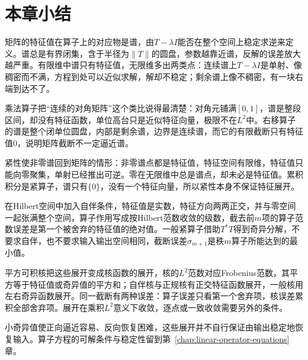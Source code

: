 \section{本章小结}
\label{sec:ospec-summary}

矩阵的特征值在算子上的对应物是谱，由$T-\lambda I$能否在整个空间上稳定求逆来定义。谱总是有界闭集，含于半径为$\lVert T\rVert$的圆盘，参数越靠近谱，反解的误差放大越严重。有限维中谱只有特征值，无限维多出两类点：连续谱上$T-\lambda I$是单射、像稠密而不满，方程到处可以近似求解，解却不稳定；剩余谱上像不稠密，有一块右端到达不了。

乘法算子把“连续的对角矩阵”这个类比说得最清楚：对角元铺满$[0,1]$，谱是整段区间，却没有特征函数，单位高台只是近似特征向量，极限不在$L^2$中。右移算子的谱是整个闭单位圆盘，内部是剩余谱，边界是连续谱，而它的有限截断只有特征值$0$，说明矩阵截断不一定逼近谱。

紧性使非零谱回到矩阵的情形：非零谱点都是特征值，特征空间有限维，特征值只能向零聚集，单射已经推出可逆。零在无限维中总是谱点，却未必是特征值。累积积分是紧算子，谱只有$\{0\}$，没有一个特征向量，所以紧性本身不保证特征展开。

在Hilbert空间中加入自伴条件，特征值是实数，特征方向两两正交，并与零空间一起张满整个空间，算子作用写成按Hilbert范数收敛的级数，截去前$m$项的算子范数误差是第一个被舍弃的特征值的绝对值。一般紧算子借助$T^*T$得到奇异分解，不要求自伴，也不要求输入输出空间相同，截断误差$\sigma_{m+1}$是秩$m$算子所能达到的最小值。

平方可积核把这些展开变成核函数的展开，核的$L^2$范数对应Frobenius范数，其平方等于特征值或奇异值的平方和；自伴核与正规核有正交特征函数展开，一般核用左右奇异函数展开。同一截断有两种误差：算子误差只看第一个舍弃项，核误差累积全部舍弃项。展开在乘积$L^2$意义下收敛，逐点或一致收敛需要另外的条件。

小奇异值使正向逼近容易、反向恢复困难，这些展开并不自行保证由输出稳定地恢复输入。算子方程的可解条件与稳定性留到第~\ref{chap:linear-operator-equations}章。

